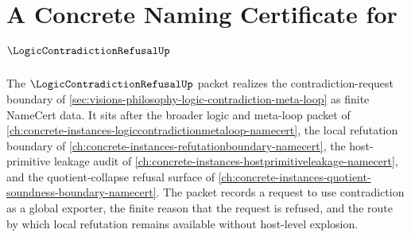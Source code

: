 \chapter{A Concrete Naming Certificate for $\LogicContradictionRefusalUp$}
\label{ch:concrete-instances-logic-contradiction-refusal-namecert}

The $\LogicContradictionRefusalUp$ packet realizes the contradiction-request boundary of \autoref{sec:visions-philosophy-logic-contradiction-meta-loop} as finite NameCert data. It sits after the broader logic and meta-loop packet of \autoref{ch:concrete-instances-logiccontradictionmetaloop-namecert}, the local refutation boundary of \autoref{ch:concrete-instances-refutationboundary-namecert}, the host-primitive leakage audit of \autoref{ch:concrete-instances-hostprimitiveleakage-namecert}, and the quotient-collapse refusal surface of \autoref{ch:concrete-instances-quotient-soundness-boundary-namecert}. The packet records a request to use contradiction as a global exporter, the finite reason that the request is refused, and the route by which local refutation remains available without host-level explosion.

